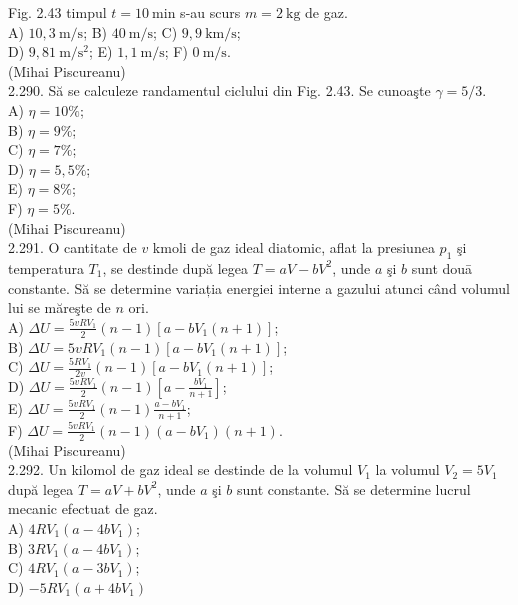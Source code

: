\documentclass[10pt]{article}
\begin{document}
Fig. 2.43 timpul $t=10 \mathrm{~min}$ s-au scurs $m=2 \mathrm{~kg}$ de gaz.\\
A) $10,3 \mathrm{~m} / \mathrm{s}$; B) $40 \mathrm{~m} / \mathrm{s}$; C) $9,9 \mathrm{~km} / \mathrm{s}$;\\
D) $9,81 \mathrm{~m} / \mathrm{s}^{2}$; E) $1,1 \mathrm{~m} / \mathrm{s}$; F) $0 \mathrm{~m} / \mathrm{s}$.\\
(Mihai Piscureanu)\\
2.290. Să se calculeze randamentul ciclului din Fig. 2.43. Se cunoaşte $\gamma=5 / 3$.\\
A) $\eta=10 \%$;\\
B) $\eta=9 \%$;\\
C) $\eta=7 \%$;\\
D) $\eta=5,5 \%$;\\
E) $\eta=8 \%$;\\
F) $\eta=5 \%$.\\
(Mihai Piscureanu)\\
2.291. O cantitate de $v$ kmoli de gaz ideal diatomic, aflat la presiunea $p_{1}$ şi temperatura $T_{1}$, se destinde după legea $T=a V-b V^{2}$, unde $a$ şi $b$ sunt douā constante. Să se determine variația energiei interne a gazului atunci când volumul lui se măreşte de $n$ ori.\\
A) $\Delta U=\frac{5 v R V_{1}}{2}(n-1)\left[a-b V_{1}(n+1)\right]$;\\
B) $\Delta U=5 v R V_{1}(n-1)\left[a-b V_{1}(n+1)\right]$;\\
C) $\Delta U=\frac{5 R V_{1}}{2 v}(n-1)\left[a-b V_{1}(n+1)\right]$;\\
D) $\Delta U=\frac{5 v R V_{1}}{2}(n-1)\left[a-\frac{b V_{1}}{n+1}\right]$;\\
E) $\Delta U=\frac{5 v R V_{1}}{2}(n-1) \frac{a-b V_{1}}{n+1}$;\\
F) $\Delta U=\frac{5 v R V_{1}}{2}(n-1)\left(a-b V_{1}\right)(n+1)$.\\
(Mihai Piscureanu)\\
2.292. Un kilomol de gaz ideal se destinde de la volumul $V_{1}$ la volumul $V_{2}=5 V_{1}$ după legea $T=a V+b V^{2}$, unde $a$ şi $b$ sunt constante. Să se determine lucrul mecanic efectuat de gaz.\\
A) $4 R V_{1}\left(a-4 b V_{1}\right)$;\\
B) $3 R V_{1}\left(a-4 b V_{1}\right)$;\\
C) $4 R V_{1}\left(a-3 b V_{1}\right)$;\\
D) $-5 R V_{1}\left(a+4 b V_{1}\right)$\\
\end{document}
